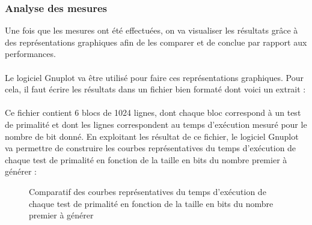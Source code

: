 		\subsubsection*{Analyse des mesures}
			Une fois que les mesures ont été effectuées, on va visualiser les résultats grâce à des représentations graphiques afin de les comparer et de conclue par rapport aux performances.
			\paragraph{} Le logiciel {\ttfamily Gnuplot} va être utilisé pour faire ces représentations graphiques. Pour cela, il faut écrire les résultats dans un fichier bien formaté dont voici un extrait :
			
			
			\paragraph{}Ce fichier contient 6 blocs de 1024 lignes, dont chaque bloc correspond à un test de primalité et dont les lignes correspondent au temps d'exécution mesuré pour le nombre de bit donné. En exploitant les résultat de ce fichier, le logiciel {\ttfamily Gnuplot} va permettre de construire les courbes représentatives du temps d'exécution de chaque test de primalité en fonction de la taille en bits du nombre premier à générer :
			
			\begin{figure}[H]\vspace{-1em}\caption{Comparatif des courbes représentatives du temps d'exécution de chaque test de primalité en fonction de la taille en bits du nombre premier à générer}\label{fig:M4}\end{figure}
			
